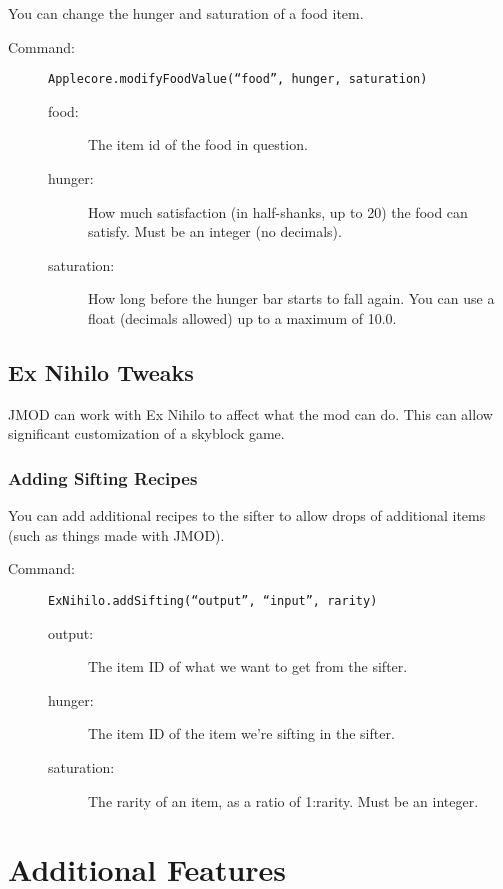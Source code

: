 \documentclass[letterpaper,titlepage,12pt]{article}
\begin{document}
You can change the hunger and saturation of a food item.

\begin{description}
\item[Command:] \texttt{Applecore.modifyFoodValue(``food'', hunger, saturation)}
\begin{description}
\item [food:] The item id of the food in question.
\item [hunger:] How much satisfaction (in half-shanks, up to 20) the food can satisfy.  Must be an integer (no decimals).
\item [saturation:] How long before the hunger bar starts to fall again.  You can use a float (decimals allowed) up to a maximum of 10.0.
\end{description}
\end{description}

\subsection{Ex Nihilo Tweaks}

JMOD can work with Ex Nihilo to affect what the mod can do.  This can allow significant customization of a skyblock game.

\subsubsection{Adding Sifting Recipes}

You can add additional recipes to the sifter to allow drops of additional items (such as things made with JMOD).

\begin{description}
\item[Command:] \texttt{ExNihilo.addSifting(``output'', ``input'', rarity)}
\begin{description}
\item [output:] The item ID of what we want to get from the sifter.
\item [hunger:] The item ID of the item we're sifting in the sifter.
\item [saturation:] The rarity of an item, as a ratio of 1:rarity.  Must be an integer.
\end{description}
\end{description}

\section{Additional Features}
\end{document}
